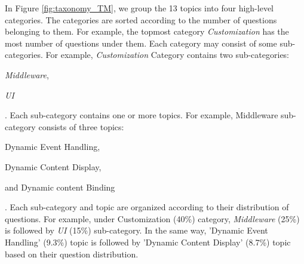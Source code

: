 In Figure \ref{fig:taxonomy_TM}, we group the 13 topics into four high-level categories. The categories are sorted according to the number of
questions belonging to them. For example, the topmost category \textit{Customization} has the most number of questions under them. Each category may consist of some
sub-categories. For example, \textit{Customization} Category contains two sub-categories:
\begin{inparaenum}[(1)]
\item \textit{Middleware},
\item \textit{UI}
\end{inparaenum}. Each sub-category contains one or more topics. For example,
Middleware sub-category consists of three topics: \begin{inparaenum}[(1)] \item
Dynamic Event Handling, \item Dynamic Content Display, \item and Dynamic content
Binding \end{inparaenum}. Each sub-category and topic are organized according to
their distribution of questions. For example, under Customization (40\%)
category, \textit{Middleware} (25\%) is followed by \textit{UI} (15\%) sub-category. In the same
way, 'Dynamic Event Handling' (9.3\%) topic is followed by 'Dynamic Content
Display' (8.7\%) topic based on their question distribution.






